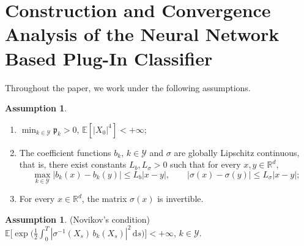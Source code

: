 \documentclass{article}
\theoremstyle{plain}
\theoremstyle{definition}
\newtheorem{assumption}[theorem]{Assumption}
\theoremstyle{remark}
\renewcommand{\d}{\mathrm{d}}
\newcommand{\RD}{\mathbb{R}^{d}}
\newcommand{\EE}{\mathbb{E}}
\newcommand{\calY}{\mathcal{Y}}
\begin{document}
\section{Construction and Convergence Analysis of the Neural Network Based Plug-In Classifier}\label{sec:main-theory}


Throughout the paper, we work under the following assumptions.
\begin{assumption}\label{assump:Lipschitz}\begin{enumerate}
    \item[$(a)$] $\min_{k\in\calY}\mathfrak{p}_k>0$, $\EE[|X_0|^4]<+\infty$; 
    \item [$(b)$] The coefficient functions $b_k, \,k\in\calY$ and $\sigma$ are globally Lipschitz continuous, that is, there exist constants $L_b, L_\sigma > 0$ such that for every $ x, y \in \mathbb{R}^d,$
    \[
        \max_{k\in\calY} |b_k(x)-b_k(y)|\leq L_b|x-y|,\qquad |\sigma(x)-\sigma(y)|\leq L_\sigma  |x-y|;\nonumber
    \]
\item[$(c)$] For every $x\in\RD$, the matrix $\sigma(x)$ is invertible.  
\end{enumerate}
\end{assumption}

%

\begin{assumption}\label{assump:Novikov} (Novikov's condition) 
  $\EE\big[\exp \big(\tfrac{1}{2}\int_0^T |\sigma^{-1}(X_s)\,b_k(X_s)|^2\,\d s\big)\big]<+\infty$,  $k\in\calY$.
\end{assumption}
\end{document}
